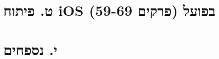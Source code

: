 \documentclass[11pt,a4paper,openany]{book}
\begin{document}
\part*{ט. פיתוח iOS בפועל (פרקים 59-69)}











\appendix
\part*{י. נספחים}









\end{document}
